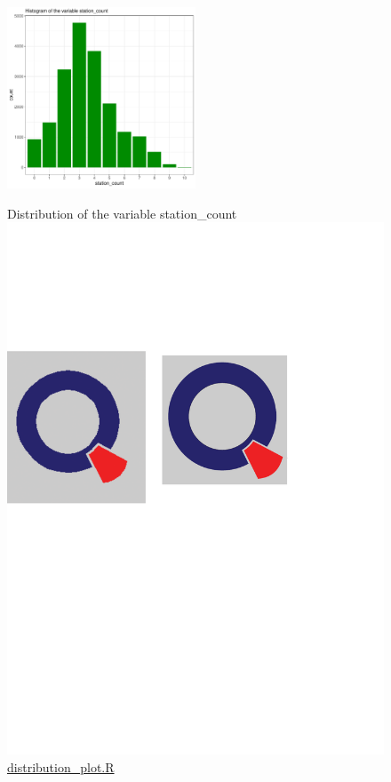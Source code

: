 \begin{figure}[H]
\begin{center}
\includegraphics[width=0.5\textwidth, keepaspectratio]{room_type_distribution.pdf} \\
\caption{Distribution of the variable station\_count \protect\includegraphics[scale=0.05]{qletlogo.pdf} {\href{https://github.com/silvia-ventoruzzo/SPL-WISE-2018/blob/master/Helpers/distribution_plot.R}{distribution\_plot.R}}}
\label{figure:catdistr}
\end{center}
\end{figure}

